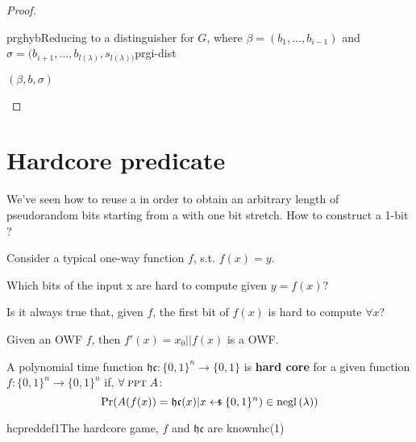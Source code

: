 \begin{proof}
\begin{cryptoredux}{prghyb}{Reducing to a distinguisher for $G$, where $\beta = (b_1, \dots, b_{i-1})$ and $\sigma = (b_{i+1}, \dots, b_{l(\lambda)}, s_{l(\lambda))}$}{prg}{i-dist}
        \cseqdelay

        {$(\beta, b, \sigma)$}{}
        
        \cseqdelay

    
    \end{cryptoredux}

\end{proof}

\pagebreak

\section{Hardcore predicate}

We've seen how to reuse a \prg{} in order to obtain an arbitrary length of pseudorandom bits starting from a \prg{} with one bit stretch. How to construct a 1-bit \prg?

Consider a typical one-way function $f$, s.t. $f(x) = y$.
\begin{question}
    Which bits of the input x are hard to compute given $y = f(x)$?

    Is it always true that, given $f$, the first bit of $f(x)$ is hard to compute $\forall x$?
\end{question}

\begin{example}
    Given an OWF $f$, then $f'(x) = x_0 || f(x)$ is a OWF.
\end{example}


\begin{defn}
    A polynomial time function $\mathfrak{hc}:\{0,1\}^{n} \to \{0,1\} $ is \textbf{hard core} for a given function $f:\{0,1\}^{n} \to \{0,1\}^{n}$ if, $\forall\; \textsc{ppt}\; A$:
    \begin{equation*}
        \Pr(A(f(x)) = \mathfrak{hc}(x) | x \pickUAR \{0,1\}^{n}) \in \negl{\lambda)}   
    \end{equation*}
\end{defn}

\begin{cryptogame}{hcpreddef1}{The hardcore game, $f$ and $\mathfrak{hc}$ are known}{hc(1)}

\end{cryptogame}


